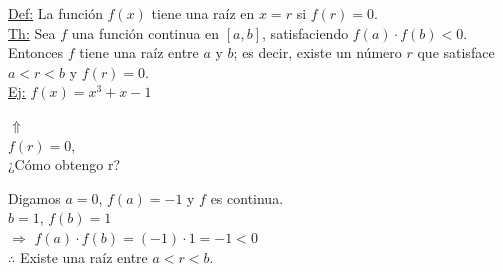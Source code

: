 
\newcommand*\circled[1]{
  \tikz[baseline=(C.base)]\node[draw,circle,inner sep=1.2pt,line width=0.2mm,](C) {#1};}
\newcommand*\Myitem{
  \stepcounter{enumi}\item[\circled{\theenumi}]}
\centering
{}
 \raggedright
\underline{Def:}
La función \(f(x)\) tiene una raíz en \(x = r\) si \(f(r) = 0\).\\
\underline{Th:} Sea \(f\) una función continua en \([a,b]\), satisfaciendo \(f(a) \cdot f(b) < 0\). Entonces \(f\) tiene una raíz entre \(a\) y \(b\); es decir, existe un número \(r\) que satisface \(a < r < b\) y \(f(r) = 0\).\\
\vspace{0.5cm}
\underline{Ej:} \(f(x) = x^{3} + x - 1\)\\
\begin{center}
\end{center}
\hspace{8cm}$\Uparrow$\\
\hspace{7cm}\(f(r) = 0\),\\
\hspace{6cm}¿Cómo obtengo r?\\
\begin{center}
\hspace{1cm} Digamos \(a = 0\), \(f(a) = -1\) y \(f\) es continua.\\
\vspace{0.5cm}\hspace{1cm} \(b = 1\), \(f(b) = 1 \)\\
\vspace{0.5cm}
$\Rightarrow$ \(f(a) \cdot f(b) = (-1) \cdot 1 = -1 < 0\)\\
\vspace{0.5cm}
$\therefore$ Existe una raíz entre \(a < r < b\).\\
\end{center}
\newpage
